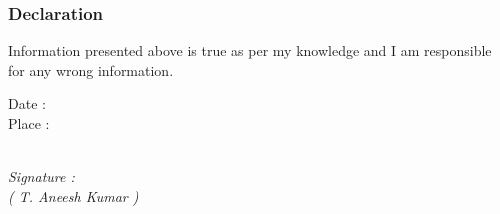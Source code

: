 \documentclass[8pt]{article}
\begin{document}
\subsubsection*{Declaration}
\hspace{1cm}Information presented above is true as per my knowledge and I am responsible for any wrong information.

\begin{multicols}{2}
 Date : \\
 \indent Place : 
\begin{flushright}
\underline{} \\
\textit{
 Signature : \underline{ \hspace{3cm} } \\
  ( T. Aneesh Kumar )
}
\end{flushright}
\end{multicols}
\end{document}
